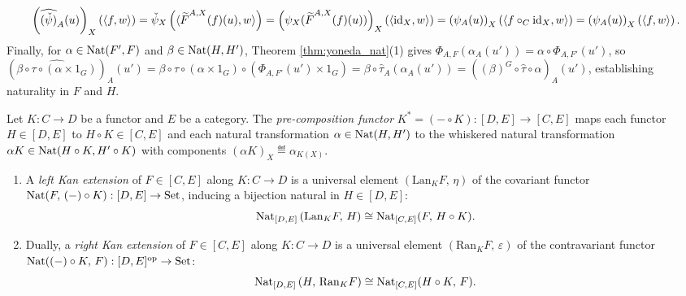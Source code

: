 \documentclass[10pt,a4paper]{article}
\begin{document}
\begin{enumerate}
\begin{itemize}
$$\left(\widehat{(\check{\psi})}_A(u)\right)_X\left(\langle f, w \rangle\right) = \check{\psi}_X\left(\langle {\widetilde{F}\textrm{}}^{A,X}(f)(u), w \rangle\right) = \left(\psi_X({\widetilde{F}\textrm{}}^{A,X}(f)(u))\right)_X\left(\langle {\textrm{id}}_X, w \rangle\right) = \left(\psi_A(u)\right)_X\left(\langle f \circ_C {\textrm{id}}_X, w \rangle\right) = \left(\psi_A(u)\right)_X\left(\langle f, w \rangle\right).$$
Finally, for $\alpha \in {\textrm{Nat}}(F', F)$ and $\beta \in {\textrm{Nat}}(H, H')$, Theorem \ref{thm:yoneda_nat}(1) gives $\Phi_{A,F}(\alpha_A(u')) = \alpha \circ \Phi_{A,F'}(u')$, so $(\widehat{\beta \circ \tau \circ (\alpha \times 1_G)})_{A}(u') = \beta \circ \tau \circ (\alpha \times 1_G) \circ (\Phi_{A,F'}(u') \times 1_G) = \beta \circ \widehat{\tau}_A(\alpha_A(u')) = ((\beta)^G \circ \widehat{\tau} \circ \alpha)_A(u')$, establishing naturality in $F$ and $H$.
\end{itemize}
\end{enumerate}
\myqed

\begin{definition}\label{def:kan_ext}
Let $K : C \to D$ be a functor and $E$ be a category. The \emph{pre-composition functor} $K^* = (- \circ K) : [D, E] \to [C, E]$ maps each functor $H \in [D, E]$ to $H \circ K \in [C, E]$ and each natural transformation $\alpha \in {\textrm{Nat}}(H, H')$ to the whiskered natural transformation $\alpha K \in {\textrm{Nat}}(H \circ K, H' \circ K)$ with components $(\alpha K)_X \eqdef \alpha_{K(X)}$.
\begin{enumerate}
\item A \emph{left Kan extension} of $F \in [C, E]$ along $K : C \to D$ is a universal element $(\mathrm{Lan}_K F,\, \eta)$ of the covariant functor ${\textrm{Nat}}(F,\, (-) \circ K) : [D, E] \to {\textrm{Set}}$, inducing a bijection natural in $H \in [D, E]$:
$${\textrm{Nat}}_{[D,E]}\left(\mathrm{Lan}_K F,\, H\right) \cong {\textrm{Nat}}_{[C,E]}(F,\, H \circ K).$$
\item Dually, a \emph{right Kan extension} of $F \in [C, E]$ along $K : C \to D$ is a universal element $(\mathrm{Ran}_K F,\, \varepsilon)$ of the contravariant functor ${\textrm{Nat}}((-) \circ K,\, F) : [D, E]^{\textrm{op}} \to {\textrm{Set}}$:
$${\textrm{Nat}}_{[D,E]}\left(H,\, \mathrm{Ran}_K F\right) \cong {\textrm{Nat}}_{[C,E]}(H \circ K,\, F).$$
\end{enumerate}
\end{definition}
\end{document}
